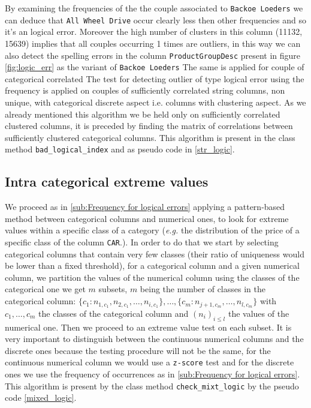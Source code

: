 \documentclass{article}
\begin{document}
By examining the frequencies of the the couple associated to \texttt{Backoe Loeders} we can deduce that \texttt{All Wheel Drive} occur clearly less then other frequencies and so it's an logical error. Moreover the high number of clusters in this column (11132, 15639) implies that all couples occurring 1 times are outliers, in this way we can also detect the spelling errors in the column \texttt{ProductGroupDesc} present in figure \ref{fig:logic_err} as the variant of \texttt{Backoe Loeders}
The same is applied for couple of categorical correlated
The test for detecting outlier of type logical error using the frequency is applied on couples of sufficiently correlated string columns, non unique, with categorical discrete aspect i.e. columns with clustering aspect.
As we already mentioned this algorithm we be held only on sufficiently correlated clustered columns, it is preceded by finding the matrix of correlations between sufficiently clustered categorical columns.
This algorithm is present in the class method \texttt{bad\_logical\_index} and as pseudo code in \ref{str_logic}.

\subsection{Intra categorical extreme values} %
\label{sub:Intra categorical extreme values}
We proceed as in \ref{sub:Frequency for logical errors} applying a pattern-based method between categorical columns and numerical ones, to look for extreme values within a specific class of a category (\textit{e.g.} the distribution of the price of a specific class of the column \texttt{CAR}.). In order to do that we start by selecting categorical columns that contain very few classes (their ratio of uniqueness would be lower than a fixed threshold), for a categorical column and a given numerical column, we partition the values of the numerical column using the classes of the categorical one we get $m$ subsets, $m$ being the number of classes in the categorical column: $\{c_1: n_{1, c_1}, n_{2, c_1}, \ldots, n_{i, c_1}\}, \ldots, \{c_m: n_{j+1, c_m}, \ldots,  n_{l, c_m}\}$ with $c_1, \ldots, c_m$ the classes of the categorical column and $(n_i)_{i \leq l}$ the values of the numerical one. Then we proceed to an extreme value test on each subset.
It is very important to distinguish between the continuous numerical columns and the discrete ones because the testing procedure will not be the same, for the continuous numerical column we would use a \texttt{z-score} test and for the discrete ones we use the frequency of occurrences as in \ref{sub:Frequency for logical errors}.
This algorithm is present by the class method \texttt{check\_mixt\_logic} by the pseudo code \ref{mixed_logic}.
\end{document}
